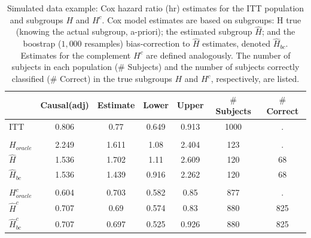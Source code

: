 \documentclass[smallextended]{svjour3}
\begin{document}
\begin{table}

\caption{\label{tab:simex_tab}\label{tab:simex} Simulated data example: Cox hazard ratio (hr) estimates for the ITT population and subgroups $H$ and $H^{c}$.
Cox model estimates are based on subgroups: H true (knowing the actual subgroup, a-priori); the estimated subgroup $\hat{H}$; and 
the boostrap ($1,000$ resamples) bias-correction to $\hat{H}$ estimates, denoted $\hat{H}_{bc}$.  Estimates for the complement $H^{c}$ are defined analogously.
The number of subjects in each population ($\#$ Subjects) and the number of subjects correctly classified ($\#$ Correct) in the true subgroups $H$ and $H^{c}$, respectively, are listed.}
\centering
\fontsize{9}{11}\selectfont
\begin{tabular}[t]{lcccccc}
\toprule
  & Causal(adj) & Estimate & Lower & Upper & $\#$ Subjects & $\#$ Correct\\
\midrule
ITT & 0.806 & 0.77 & 0.649 & 0.913 & 1000 & .\\
\addlinespace[0.3em]
\multicolumn{7}{l}{\textbf{H subgroup estimates}}\\
\hspace{1em}$H_{oracle}$ & 2.249 & 1.611 & 1.08 & 2.404 & 123 & .\\
\hspace{1em}$\hat{H}$ & 1.536 & 1.702 & 1.11 & 2.609 & 120 & 68\\
\hspace{1em}$\hat{H}_{bc}$ & 1.536 & 1.439 & 0.916 & 2.262 & 120 & 68\\
\addlinespace[0.3em]
\multicolumn{7}{l}{\textbf{H-complement subgroup estimates}}\\
\hspace{1em}$H^{c}_{oracle}$ & 0.604 & 0.703 & 0.582 & 0.85 & 877 & .\\
\hspace{1em}$\hat{H}^{c}$ & 0.707 & 0.69 & 0.574 & 0.83 & 880 & 825\\
\hspace{1em}$\hat{H}^{c}_{bc}$ & 0.707 & 0.697 & 0.525 & 0.926 & 880 & 825\\
\bottomrule
\end{tabular}
\end{table}





\end{document}

